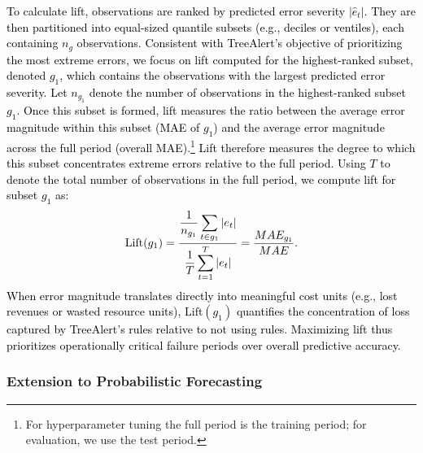 \documentclass[12pt]{article}
\newcommand{\matt}[1]{\textcolor{black}{#1}}
\begin{document}

\matt{To calculate lift, observations are ranked by predicted error severity $|\hat{e}_t|$. They are then partitioned into equal-sized quantile subsets (e.g., deciles or ventiles), each containing \( n_g \) observations. Consistent with TreeAlert’s objective of prioritizing the most extreme errors, we focus on lift computed for the highest-ranked subset, denoted \( g_{1} \), which contains the observations with the largest predicted error severity. Let \( n_{g_1} \) denote the number of observations in the highest-ranked subset \( g_{1} \). Once this subset is formed, lift measures the ratio between the average error magnitude within this subset (MAE of $g_1$) and the average  error magnitude across the full %
period (overall MAE).\footnote{For hyperparameter tuning the full period is the training period; for evaluation, we use the test period.} Lift therefore measures the degree to which this subset concentrates extreme errors relative to the full %
period. Using \( T \) to denote the total number of observations in the full %
period, we compute lift for subset \( g_{1} \) as:
\begin{equation}
\text{Lift}(g_{1}) =
\frac{
\displaystyle \frac{1}{n_{g_1}}\sum_{t\in {g_1}} |e_t|
}{
\displaystyle \frac{1}{T}\sum_{t=1}^{T} |e_t|
} = \frac{MAE_{g_1}}{MAE}.
\end{equation}
When error magnitude translates directly into meaningful cost units (e.g., lost revenues or wasted resource units), $\text{Lift}(g_1)$ quantifies the concentration of loss captured by TreeAlert's rules relative to not using rules. Maximizing lift thus prioritizes operationally critical failure periods over overall predictive 
accuracy.} %

\subsubsection{Extension to Probabilistic Forecasting}
\end{document}
